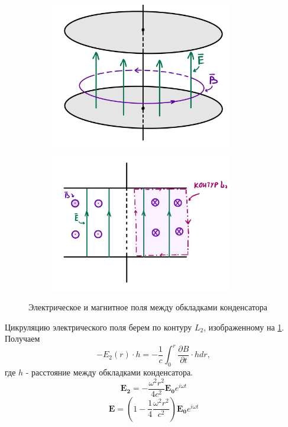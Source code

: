 \newpage
\begin{figure}[h!]
    \centering
    \begin{subfigure}{0.48\linewidth}
        \includegraphics[width = 8cm]{images/cond1.jpg}
    \end{subfigure}
    \begin{subfigure}{0.48\linewidth}
        \includegraphics[width = 8cm]{images/cond2.jpg}
    \end{subfigure}
    \caption{Электрическое и магнитное поля между обкладками конденсатора} \label{table:cond}
\end{figure}

\noindent
Цикруляцию электрического поля берем по контуру $L_2$, изображенному на \ref{table:cond}. Получаем 
$$-E_2(r) \cdot h = -\frac{1}{c}\int_{0}^{r} \frac{\partial B}{\partial t} \cdot h dr,$$
где $h$ - расстояние между обкладками конденсатора.
\begin{equation}
    \mathbf{E_2} = -\frac{\omega^2 r^2}{4 c^2}\mathbf{E_0} e^{i\omega t}
\end{equation}
\begin{equation}
    \mathbf{E} = \left (1 - \frac{1}{4}\frac{\omega^2 r^2}{c^2}\right ) \mathbf{E_0} e^{i\omega t}
\end{equation}

